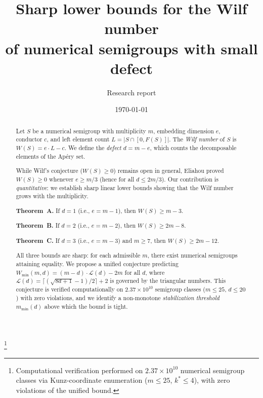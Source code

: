 \documentclass[11pt]{amsart}
\theoremstyle{definition}
\theoremstyle{remark}
\begin{document}
\title[Sharp lower bounds for the Wilf number]{Sharp lower bounds for the Wilf number\\of numerical semigroups with small defect}

\author{Research report}

\date{\today}

\thanks{Computational verification performed on $2.37 \times 10^{10}$ numerical semigroup classes via Kunz-coordinate enumeration ($m \le 25$, $k^* \le 4$), with zero violations of the unified bound.}

\begin{abstract}
Let $S$ be a numerical semigroup with multiplicity $m$, embedding dimension $e$,
conductor $c$, and left element count $L = |S \cap [0, F(S)]|$.
The \emph{Wilf number} of $S$ is $W(S) = e \cdot L - c$.
We define the \emph{defect} $d = m - e$, which counts the decomposable elements
of the Ap\'ery set.

While Wilf's conjecture ($W(S) \ge 0$) remains open in general,
Eliahou proved $W(S) \ge 0$ whenever $e \ge m/3$ (hence for all $d \le 2m/3$).
Our contribution is \emph{quantitative}: we establish sharp linear lower bounds
showing that the Wilf number grows with the multiplicity.

\textbf{Theorem~A.} If $d = 1$ (i.e., $e = m - 1$), then $W(S) \ge m - 3$.

\textbf{Theorem~B.} If $d = 2$ (i.e., $e = m - 2$), then $W(S) \ge 2m - 8$.

\textbf{Theorem~C.} If $d = 3$ (i.e., $e = m - 3$) and $m \ge 7$, then $W(S) \ge 2m - 12$.

All three bounds are sharp: for each admissible $m$, there exist numerical semigroups
attaining equality.
We propose a unified conjecture
predicting $W_{\min}(m,d) = (m - d) \cdot \mathcal{L}(d) - 2m$ for all $d$,
where $\mathcal{L}(d) = \lceil (\sqrt{8d+1} - 1)/2 \rceil + 2$
is governed by the triangular numbers.
This conjecture is verified computationally on $2.37 \times 10^{10}$
semigroup classes ($m \le 25$, $d \le 20$) with zero violations,
and we identify a non-monotone \emph{stabilization threshold} $m_{\min}(d)$
above which the bound is tight.
\end{abstract}

\maketitle
\setcounter{tocdepth}{2}
\tableofcontents

\end{document}
